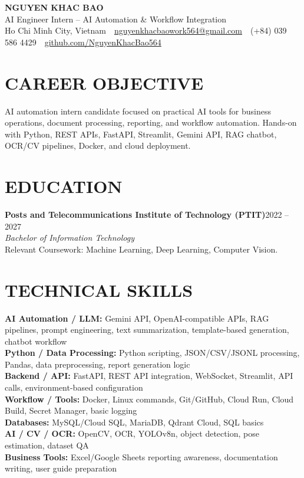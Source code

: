 \documentclass[10pt,a4paper]{article}
\newcommand{\entryhead}[2]{%
    \noindent\textbf{#1}\hfill #2\\[-2pt]
}
\newcommand{\entrysub}[1]{%
    \noindent\textit{#1}\\[-1pt]
}
\begin{document}
\fontsize{9}{9.9}\selectfont

\begin{center}
    {\Large\textbf{NGUYEN KHAC BAO}}\\[-1pt]
    AI Engineer Intern -- AI Automation \& Workflow Integration\\[2pt]
    Ho Chi Minh City, Vietnam
    \,\textbar\,
    \href{mailto:nguyenkhacbaowork564@gmail.com}{nguyenkhacbaowork564@gmail.com}
    \,\textbar\,
    (+84) 039 586 4429
    \,\textbar\,
    \href{https://github.com/NguyenKhacBao564}{github.com/NguyenKhacBao564}
\end{center}

\section{CAREER OBJECTIVE}
AI automation intern candidate focused on practical AI tools for business operations, document processing, reporting, and workflow automation. Hands-on with Python, REST APIs, FastAPI, Streamlit, Gemini API, RAG chatbot, OCR/CV pipelines, Docker, and cloud deployment.

\section{EDUCATION}
\entryhead{Posts and Telecommunications Institute of Technology (PTIT)}{2022 -- 2027}
\entrysub{Bachelor of Information Technology}
Relevant Coursework: Machine Learning, Deep Learning, Computer Vision.

\section{TECHNICAL SKILLS}
\textbf{AI Automation / LLM:} Gemini API, OpenAI-compatible APIs, RAG pipelines, prompt engineering, text summarization, template-based generation, chatbot workflow\\
\textbf{Python / Data Processing:} Python scripting, JSON/CSV/JSONL processing, Pandas, data preprocessing, report generation logic\\
\textbf{Backend / API:} FastAPI, REST API integration, WebSocket, Streamlit, API calls, environment-based configuration\\
\textbf{Workflow / Tools:} Docker, Linux commands, Git/GitHub, Cloud Run, Cloud Build, Secret Manager, basic logging\\
\textbf{Databases:} MySQL/Cloud SQL, MariaDB, Qdrant Cloud, SQL basics\\
\textbf{AI / CV / OCR:} OpenCV, OCR, YOLOv8n, object detection, pose estimation, dataset QA\\
\textbf{Business Tools:} Excel/Google Sheets reporting awareness, documentation writing, user guide preparation
\end{document}
